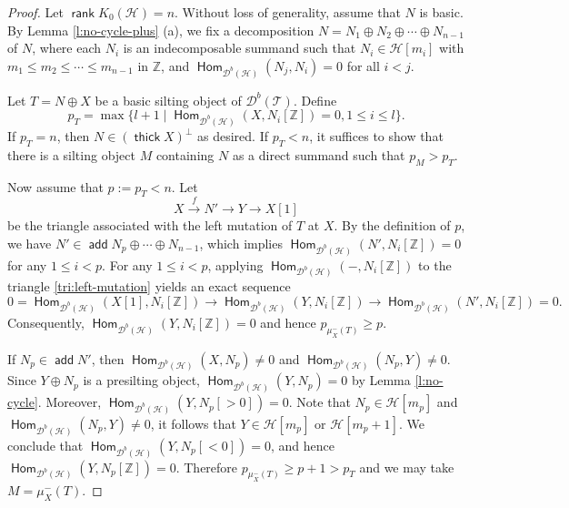 \documentclass[10pt,a4paper]{amsart}
\newcommand{\Hom}{\opname{Hom}}
\newcommand{\add}{\opname{add}\nolimits}
\newcommand{\cd}{{\mathcal D}}
\newcommand{\der}{\cd}
\newcommand{\opname}[1]{\operatorname{\mathsf{#1}}}
\newcommand{\rank}{\opname{rank}\nolimits}
\newcommand{\thick}{\opname{thick}}
\begin{document}
\begin{proof}
Let $\rank K_0(\mathcal{H})=n$.
Without loss of generality, assume that $N$ is basic. By Lemma \ref{l:no-cycle-plus} (a), we fix a decomposition  $N =  N_1 \oplus N_2 \oplus \cdots \oplus N_{n-1}$ of $N$, where each $N_i$ is an indecomposable summand such that $N_i \in \mathcal{H}[m_i]$ with $m_1 \leq m_2 \leq \cdots \leq m_{n-1}$ in $\mathbb{Z}$, and $\Hom_{\der^b(\mathcal{H})}(N_j, N_i) = 0$ for all $i < j$. 

Let $T=N\oplus X$ be a basic silting object of $\der^b(\mathcal{T})$. Define 
\[
p_T=\max\{l+1 \mid \Hom_{\der^b(\mathcal{H})}(X,N_i[\mathbb{Z}])=0, 1\leq i\leq l\}.
\]
If $p_T=n$, then $N\in (\thick X)^\perp$ as desired.  If $p_T<n$,  it suffices to  show that there is a silting object $M$ containing $N$ as a direct summand such that $p_M>p_T$.

Now assume that $p:=p_T<n$. 
Let 
\begin{equation}\label{tri:left-mutation}
    X\xrightarrow{f} N'\to Y\to X[1]
\end{equation} 
be the triangle associated with the left mutation of $T$ at $X$. By the definition of $p$, we have $N'\in \add N_p\oplus\cdots\oplus N_{n-1}$, which implies $\Hom_{\der^b(\mathcal{H})}(N',N_i[\mathbb{Z}])=0$ for any $1\leq i<p$. For any $1\leq i<p$, applying $\Hom_{\der^b(\mathcal{H})}(-,N_i[\mathbb{Z}])$ to the triangle \eqref{tri:left-mutation} yields an exact sequence
\[
0=\Hom_{\der^b(\mathcal{H})}(X[1],N_i[\mathbb{Z}])\to \Hom_{\der^b(\mathcal{H})}(Y,N_i[\mathbb{Z}])\to \Hom_{\der^b(\mathcal{H})}(N',N_i[\mathbb{Z}])=0.
\]
Consequently, $\Hom_{\der^b(\mathcal{H})}(Y,N_i[\mathbb{Z}])=0$ and hence $p_{\mu_X^-(T)} \geq p$.




If $N_p\in \add N'$, then $\Hom_{\der^b(\mathcal{H})}(X,N_p)\neq 0$ and $\Hom_{\der^b(\mathcal{H})}(N_p,Y)\neq 0$. Since $Y\oplus N_p$ is a presilting object,  $\Hom_{\der^b(\mathcal{H})}(Y,N_p)=0$ by Lemma \ref{l:no-cycle}. Moreover, $\Hom_{\der^b(\mathcal{H})}(Y,N_p[>0])=0$.  Note that $N_p\in \mathcal{H}[m_p]$ and $\Hom_{\der^b(\mathcal{H})}(N_p,Y)\neq 0$, it follows that $Y\in \mathcal{H}[m_p]$ or $\mathcal{H}[m_p+1]$. We conclude that $\Hom_{\der^b(\mathcal{H})}(Y,N_p[<0])=0$, and hence $\Hom_{\der^b(\mathcal{H})}(Y,N_p[\mathbb{Z}])=0$. Therefore $p_{\mu_X^-(T)}\geq p+1>p_T$ and we may take $M=\mu_X^-(T)$.


\end{proof}
\end{document}
